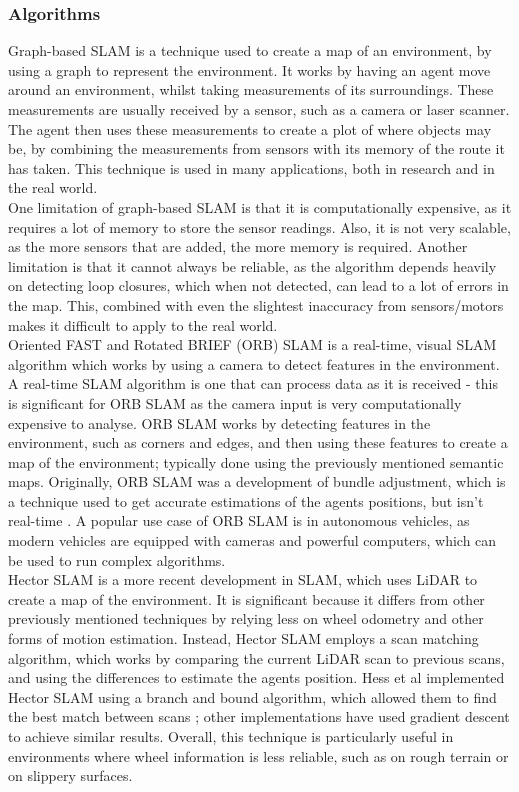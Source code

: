 \documentclass[12pt]{article}
\begin{document}
\subsubsection{Algorithms}
Graph-based SLAM is a technique used to create a map of an environment, by using a graph to represent the environment. It
works by having an agent move around an environment, whilst taking measurements of its surroundings. These measurements
are usually received by a sensor, such as a camera or laser scanner. The agent then uses these measurements to create a
plot of where objects may be, by combining the measurements from sensors with its memory of the route it has taken. This
technique is used in many applications, both in research and in the real world.\\
One limitation of graph-based SLAM is that it is computationally expensive, as it requires a lot of memory to store the
sensor readings. Also, it is not very scalable, as the more sensors that are added, the more memory is required. Another
limitation is that it cannot always be reliable, as the algorithm depends heavily on detecting loop closures, which when
not detected, can lead to a lot of errors in the map. This, combined with even the slightest inaccuracy from sensors/motors
makes it difficult to apply to the real world.\\
Oriented FAST and Rotated BRIEF (ORB) SLAM is a real-time, visual SLAM algorithm which works by using a camera to detect features
in the environment. A real-time SLAM algorithm is one that can process data as it is received - this is significant for ORB SLAM
as the camera input is very computationally expensive to analyse. ORB SLAM works by detecting features in the environment, such
as corners and edges, and then using these features to create a map of the environment; typically done using the previously
mentioned semantic maps. Originally, ORB SLAM was a development of bundle adjustment, which is a technique used to get accurate
estimations of the agents positions, but isn't real-time \cite{ORB_SLAM}. A popular use case of ORB SLAM is in autonomous vehicles,
as modern vehicles are equipped with cameras and powerful computers, which can be used to run complex algorithms.\\
Hector SLAM is a more recent development in SLAM, which uses LiDAR to create a map of the environment. It is significant because it
differs from other previously mentioned techniques by relying less on wheel odometry and other forms of motion estimation. Instead,
Hector SLAM employs a scan matching algorithm, which works by comparing the current LiDAR scan to previous scans, and using the
differences to estimate the agents position. Hess et al implemented Hector SLAM using a branch and bound algorithm, which allowed
them to find the best match between scans \cite{Hector_SLAM}; other implementations have used gradient descent to achieve similar
results. Overall, this technique is particularly useful in environments where wheel information is less reliable, such as on rough terrain
or on slippery surfaces. \\
\end{document}
